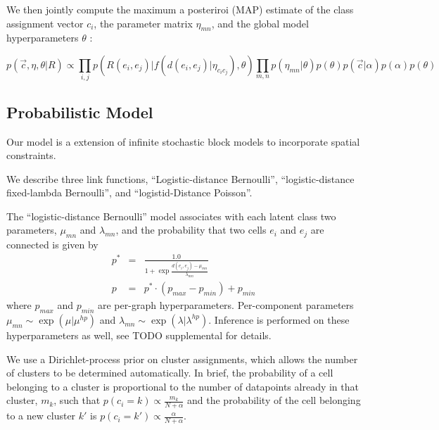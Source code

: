 \documentclass{article}
\begin{document}
We then jointly compute the maximum a posteriroi (MAP) estimate of the
class assignment vector ${c_i}$, the parameter matrix $\eta_{mn}$, and
the global model hyperparameters $\theta$ :

\begin{equation}
  p(\vec{c}, \eta, \theta | R ) \propto \prod_{i, j} p(R(e_i, e_j) | f(d(e_i, e_j) | \eta_{c_ic_j}), \theta) \prod_{m, n} p(\eta_{mn} | \theta)  p(\theta) p(\vec{c} | \alpha) p(\alpha) p(\theta)
\end{equation}



\subsection{Probabilistic Model}

Our model is a extension of infinite stochastic block models
\autocite{Kemp2006a, other guys} to incorporate spatial constraints.


We describe three link functions, ``Logistic-distance Bernoulli'',
``logistic-distance fixed-lambda Bernoulli'', and ``logistid-Distance
Poisson''. 

The ``logistic-distance Bernoulli'' model associates with each latent class 
two parameters, $\mu_{mn}$ and $\lambda_{mn}$, and the probability that two
cells $e_i$ and $e_j$ are connected is given by
\begin{eqnarray}
p^* &=& \frac{1.0}{1 + \exp \frac{d(e_i, e_j) - \mu_{mn}}{\lambda_{mn}}}\\
p &= & p^* \cdot (p_{max} - p_{min}) + p_{min}
\end{eqnarray}
where $p_{max}$ and $p_{min}$ are per-graph hyperparameters. Per-component parameters $\mu_{mn} \sim \exp(\mu | \mu^{hp})$ and $\lambda_{mn} \sim \exp(\lambda | \lambda^{hp})$. 
Inference is performed on these hyperparameters as well, see TODO supplemental 
for details. 

We use a Dirichlet-process prior on cluster assignments, which allows
the number of clusters to be determined automatically. In brief, the
probability of a cell belonging to a cluster is proportional to the
number of datapoints already in that cluster, $m_k$, such that $p(c_i
= k) \propto \frac{m_k}{N + \alpha}$ and the probability of the cell
belonging to a new cluster $k'$ is $p(c_i = k') \propto
\frac{\alpha}{N + \alpha}$.
\end{document}
